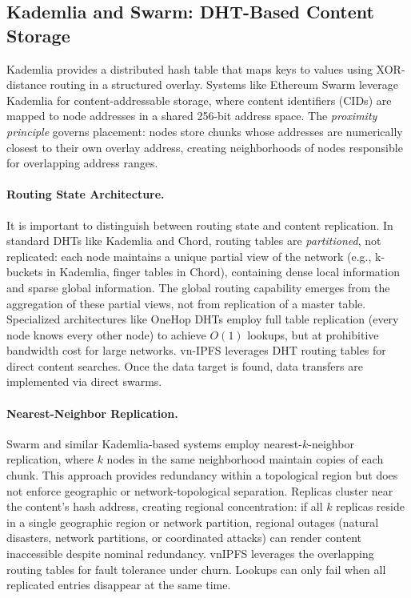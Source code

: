 \documentclass[runningheads]{llncs}
\begin{document}
\subsection{Kademlia and Swarm: DHT-Based Content Storage}
Kademlia \cite{StoicaChord01} provides a distributed hash table that maps keys to values using XOR-distance routing in a structured overlay. Systems like Ethereum Swarm leverage Kademlia for content-addressable storage, where content identifiers (CIDs) are mapped to node addresses in a shared 256-bit address space. The \emph{proximity principle} governs placement: nodes store chunks whose addresses are numerically closest to their own overlay address, creating neighborhoods of nodes responsible for overlapping address ranges.

\paragraph{Routing State Architecture.}
It is important to distinguish between routing state and content replication. In standard DHTs like Kademlia and Chord, routing tables are \emph{partitioned}, not replicated: each node maintains a unique partial view of the network (e.g., k-buckets in Kademlia, finger tables in Chord), containing dense local information and sparse global information. The global routing capability emerges from the aggregation of these partial views, not from replication of a master table. Specialized architectures like OneHop DHTs employ full table replication (every node knows every other node) to achieve $O(1)$ lookups, but at prohibitive bandwidth cost for large networks. vn-IPFS leverages DHT routing tables for direct content searches. Once the data target is found, data transfers are implemented via direct swarms.

\paragraph{Nearest-Neighbor Replication.}
Swarm and similar Kademlia-based systems employ nearest-$k$-neighbor replication, where $k$ nodes in the same neighborhood maintain copies of each chunk. This approach provides redundancy within a topological region but does not enforce geographic or network-topological separation. Replicas cluster near the content's hash address, creating regional concentration: if all $k$ replicas reside in a single geographic region or network partition, regional outages (natural disasters, network partitions, or coordinated attacks) can render content inaccessible despite nominal redundancy. vnIPFS leverages the overlapping routing tables for fault tolerance under churn. Lookups can only fail when all replicated entries disappear at the same time.
\end{document}

